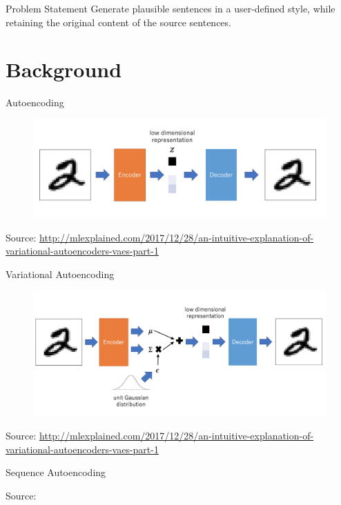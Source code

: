 \documentclass[aspectratio=169]{beamer}
\newcommand{\imgsrc}[1]{\tiny{Source: #1}}
\begin{document}
\begin{frame}{Problem Statement}
	\centering
	\Huge{Generate plausible sentences in a user-defined style, while retaining the original content of the source sentences.}
\end{frame}

% 

\section{Background}

\begin{frame}{Autoencoding}
	\centering
	\begin{figure}[ht]
		\includegraphics[width=\linewidth]{dae-structure}
	\end{figure}
	\imgsrc{\url{http://mlexplained.com/2017/12/28/an-intuitive-explanation-of-variational-autoencoders-vaes-part-1}}
\end{frame}

\begin{frame}{Variational Autoencoding}
	\centering
	\begin{figure}[ht]
		\includegraphics[width=\linewidth]{vae-structure}
	\end{figure}
	\imgsrc{\url{http://mlexplained.com/2017/12/28/an-intuitive-explanation-of-variational-autoencoders-vaes-part-1}}
\end{frame}

\begin{frame}{Sequence Autoencoding}
	\centering
	\begin{figure}[ht]
		
	\end{figure}
	\imgsrc{\citet{srivastava2015unsupervised}}
\end{frame}
\end{document}
